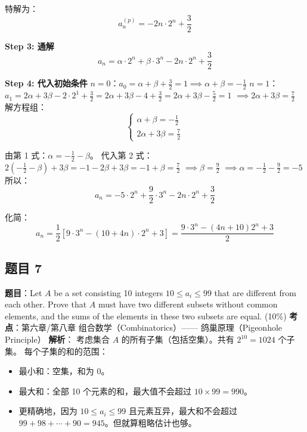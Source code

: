 \documentclass[10pt,a4paper,openany]{ctexbook}
\theoremstyle{definition}
\theoremstyle{remark}
\begin{document}
特解为：
\[
a_n^{(p)} = -2n \cdot 2^n + \frac{3}{2}
\]

\textbf{Step 3: 通解}
\[
a_n = \alpha \cdot 2^n + \beta \cdot 3^n - 2n \cdot 2^n + \frac{3}{2}
\]

\textbf{Step 4: 代入初始条件}
$n = 0$：$a_0 = \alpha + \beta + \frac{3}{2} = 1 \implies \alpha + \beta = -\frac{1}{2}$
$n = 1$：$a_1 = 2\alpha + 3\beta - 2 \cdot 2^1 + \frac{3}{2} = 2\alpha + 3\beta - 4 + \frac{3}{2} = 2\alpha + 3\beta - \frac{5}{2} = 1$
$\implies 2\alpha + 3\beta = \frac{7}{2}$
解方程组：
\[
\begin{cases}
\alpha + \beta = -\frac{1}{2} \\
2\alpha + 3\beta = \frac{7}{2}
\end{cases}
\]

由第 1 式：$\alpha = -\frac{1}{2} - \beta$。
代入第 2 式：$2(-\frac{1}{2} - \beta) + 3\beta = -1 - 2\beta + 3\beta = -1 + \beta = \frac{7}{2}$
$\implies \beta = \frac{9}{2}$
$\implies \alpha = -\frac{1}{2} - \frac{9}{2} = -5$
所以：
\[
a_n = -5 \cdot 2^n + \frac{9}{2} \cdot 3^n - 2n \cdot 2^n + \frac{3}{2}
\]

化简：
\[
a_n = \frac{1}{2} \left[ 9 \cdot 3^n - (10 + 4n) \cdot 2^n + 3 \right] = \frac{9 \cdot 3^n - (4n + 10)2^n + 3}{2}
\]

\vspace{-2pt}

\subsection{题目 7}

\textbf{题目}：Let $A$ be a set consisting 10 integers $10 \leq a_i \leq 99$ that are different from each other. Prove that $A$ must have two different subsets without common elements, and the sums of the elements in these two subsets are equal. (10\%)
\textbf{考点}：第六章/第八章 组合数学（Combinatorics）—— 鸽巢原理（Pigeonhole Principle）
\textbf{解析}：
考虑集合 $A$ 的所有子集（包括空集）。共有 $2^{10} = 1024$ 个子集。
每个子集的和的范围：
\begin{itemize}
\item 最小和：空集，和为 0。
\item 最大和：全部 10 个元素的和，最大值不会超过 $10 \times 99 = 990$。
\item 更精确地，因为 $10 \leq a_i \leq 99$ 且元素互异，最大和不会超过 $99+98+\cdots+90 = 945$。但就算粗略估计也够。

\end{itemize}
\end{document}
